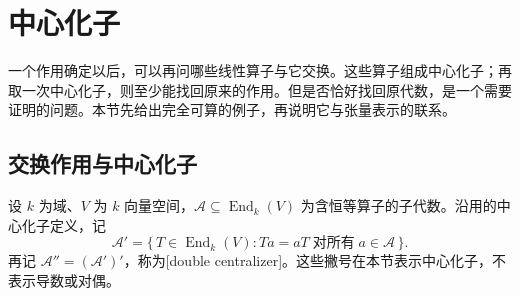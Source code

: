
\section{中心化子}
\label{b2:sec:1104}

一个作用确定以后，可以再问哪些线性算子与它交换。这些算子组成中心化子；再取一次中心化子，则至少能找回原来的作用。但是否恰好找回原代数，是一个需要证明的问题。本节先给出完全可算的例子，再说明它与张量表示的联系。

%
%
%

\subsection{交换作用与中心化子}
\label{b2:subsec:1104:01}

设 \(k\) 为域、\(V\) 为 \(k\) 向量空间，\(\mathcal A\subseteq\operatorname{End}_k(V)\) 为含恒等算子的子代数。沿用的中心化子定义，记
\[
	\mathcal A'=\bigl\{\,T\in\operatorname{End}_k(V):Ta=aT\;\text{对所有}\;a\in\mathcal A\,\bigr\}.
\]
再记 \(\mathcal A''=(\mathcal A')'\)，称为[double centralizer]。这些撇号在本节表示中心化子，不表示导数或对偶。

